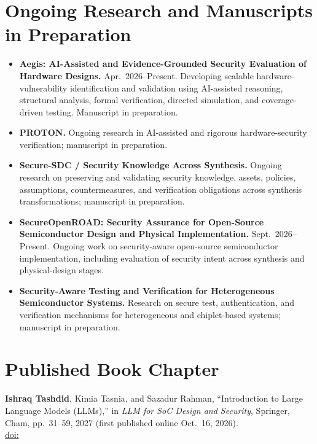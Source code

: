 \documentclass[11pt,letterpaper]{article}
\newcommand{\doi}[1]{\href{https://doi.org/#1}{doi:\detokenize{#1}}}
\newcommand{\me}{\textbf{Ishraq Tashdid}}
\begin{document}
\section*{Ongoing Research and Manuscripts in Preparation}
\begin{itemize}
  \item \textbf{Aegis: AI-Assisted and Evidence-Grounded Security Evaluation of Hardware Designs.}
  Apr.\ 2026--Present. Developing scalable hardware-vulnerability identification and validation
  using AI-assisted reasoning, structural analysis, formal verification, directed simulation, and
  coverage-driven testing. Manuscript in preparation.
  \item \textbf{PROTON.} Ongoing research in AI-assisted and rigorous hardware-security verification;
  manuscript in preparation.
  \item \textbf{Secure-SDC / Security Knowledge Across Synthesis.} Ongoing research on preserving
  and validating security knowledge, assets, policies, assumptions, countermeasures, and verification
  obligations across synthesis transformations; manuscript in preparation.
  \item \textbf{SecureOpenROAD: Security Assurance for Open-Source Semiconductor Design and Physical
  Implementation.} Sept.\ 2026--Present. Ongoing work on security-aware open-source semiconductor
  implementation, including evaluation of security intent across synthesis and physical-design stages.
  \item \textbf{Security-Aware Testing and Verification for Heterogeneous Semiconductor Systems.}
  Research on secure test, authentication, and verification mechanisms for heterogeneous and
  chiplet-based systems; manuscript in preparation.
\end{itemize}

\section*{Published Book Chapter}
\me, Kimia Tasnia, and Sazadur Rahman, ``Introduction to Large Language Models (LLMs),'' in
\textit{LLM for SoC Design and Security}, Springer, Cham, pp.~31--59, 2027 (first published online
Oct.\ 16, 2026).\\
\doi{10.1007/978-3-032-34116-7_2}

\end{document}

